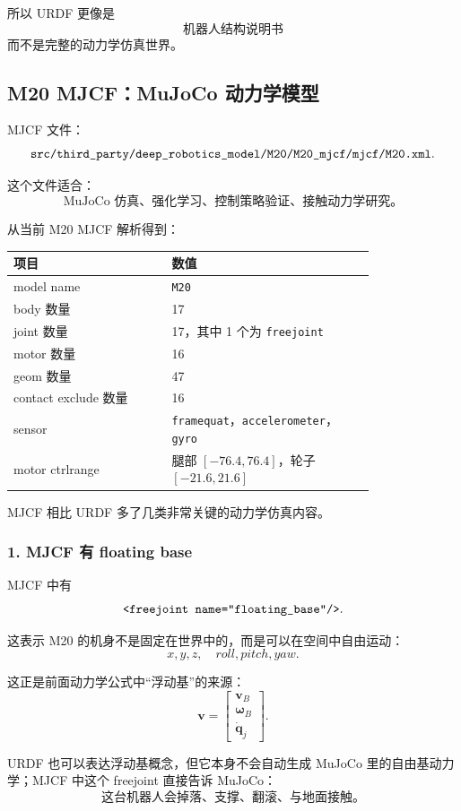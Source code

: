 \documentclass[UTF8,11pt,a4paper]{ctexart}
\newcommand{\bs}[1]{\bm{#1}}
\begin{document}
所以 URDF 更像是
\[
\boxed{
\text{机器人结构说明书}
}
\]
而不是完整的动力学仿真世界。

\subsection{M20 MJCF：MuJoCo 动力学模型}

MJCF 文件：
\[
\text{\texttt{src/third\_party/deep\_robotics\_model/M20/M20\_mjcf/mjcf/M20.xml}}.
\]

这个文件适合：
\[
\text{MuJoCo 仿真、强化学习、控制策略验证、接触动力学研究。}
\]

从当前 M20 MJCF 解析得到：

\begin{center}
\begin{tabular}{p{0.35\linewidth}p{0.45\linewidth}}
\toprule
项目 & 数值 \\
\midrule
model name & \texttt{M20}\\
body 数量 & 17\\
joint 数量 & 17，其中 1 个为 \texttt{freejoint}\\
motor 数量 & 16\\
geom 数量 & 47\\
contact exclude 数量 & 16\\
sensor & \texttt{framequat}，\texttt{accelerometer}，\texttt{gyro}\\
motor ctrlrange & 腿部 \([-76.4,76.4]\)，轮子 \([-21.6,21.6]\)\\
\bottomrule
\end{tabular}
\end{center}

MJCF 相比 URDF 多了几类非常关键的动力学仿真内容。

\subsubsection{1. MJCF 有 floating base}

MJCF 中有
\[
\text{\texttt{<freejoint name="floating\_base"/>}}.
\]

这表示 M20 的机身不是固定在世界中的，而是可以在空间中自由运动：
\[
x,y,z,\quad roll,pitch,yaw.
\]

这正是前面动力学公式中“浮动基”的来源：
\[
\bs v =
\begin{bmatrix}
\bs v_B\\
\bs \omega_B\\
\dot{\bs q}_j
\end{bmatrix}.
\]

URDF 也可以表达浮动基概念，但它本身不会自动生成 MuJoCo 里的自由基动力学；MJCF 中这个 freejoint 直接告诉 MuJoCo：
\[
\text{这台机器人会掉落、支撑、翻滚、与地面接触。}
\]
\end{document}

